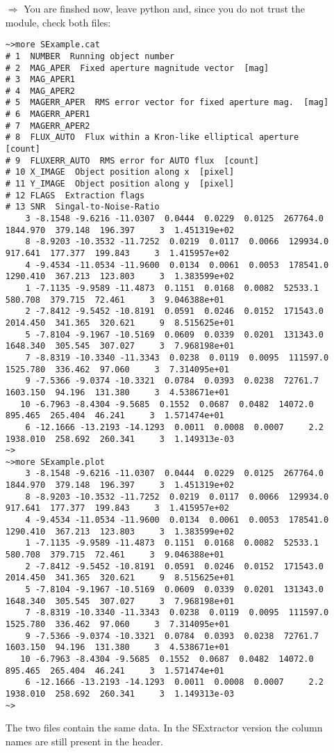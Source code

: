 \begin{itemize}
\item[$\Rightarrow$] You are finshed now, leave python and, since you do not
trust the \AAD module, check both files:
\begin{tiny}
\begin{verbatim}
~>more SExample.cat
# 1  NUMBER  Running object number
# 2  MAG_APER  Fixed aperture magnitude vector  [mag]
# 3  MAG_APER1
# 4  MAG_APER2
# 5  MAGERR_APER  RMS error vector for fixed aperture mag.  [mag]
# 6  MAGERR_APER1
# 7  MAGERR_APER2
# 8  FLUX_AUTO  Flux within a Kron-like elliptical aperture  [count]
# 9  FLUXERR_AUTO  RMS error for AUTO flux  [count]
# 10 X_IMAGE  Object position along x  [pixel]
# 11 Y_IMAGE  Object position along y  [pixel]
# 12 FLAGS  Extraction flags
# 13 SNR  Singal-to-Noise-Ratio
    3 -8.1548 -9.6216 -11.0307  0.0444  0.0229  0.0125  267764.0  1844.970  379.148  196.397     3  1.451319e+02
    8 -8.9203 -10.3532 -11.7252  0.0219  0.0117  0.0066  129934.0  917.641  177.377  199.843     3  1.415957e+02
    4 -9.4534 -11.0534 -11.9600  0.0134  0.0061  0.0053  178541.0  1290.410  367.213  123.803     3  1.383599e+02
    1 -7.1135 -9.9589 -11.4873  0.1151  0.0168  0.0082  52533.1  580.708  379.715  72.461     3  9.046388e+01
    2 -7.8412 -9.5452 -10.8191  0.0591  0.0246  0.0152  171543.0  2014.450  341.365  320.621     9  8.515625e+01
    5 -7.8104 -9.1967 -10.5169  0.0609  0.0339  0.0201  131343.0  1648.340  305.545  307.027     3  7.968198e+01
    7 -8.8319 -10.3340 -11.3343  0.0238  0.0119  0.0095  111597.0  1525.780  336.462  97.060     3  7.314095e+01
    9 -7.5366 -9.0374 -10.3321  0.0784  0.0393  0.0238  72761.7  1603.150  94.196  131.380     3  4.538671e+01
   10 -6.7963 -8.4304 -9.5685  0.1552  0.0687  0.0482  14072.0  895.465  265.404  46.241     3  1.571474e+01
    6 -12.1666 -13.2193 -14.1293  0.0011  0.0008  0.0007     2.2  1938.010  258.692  260.341     3  1.149313e-03
~>
~>more SExample.plot
    3 -8.1548 -9.6216 -11.0307  0.0444  0.0229  0.0125  267764.0  1844.970  379.148  196.397     3  1.451319e+02
    8 -8.9203 -10.3532 -11.7252  0.0219  0.0117  0.0066  129934.0  917.641  177.377  199.843     3  1.415957e+02
    4 -9.4534 -11.0534 -11.9600  0.0134  0.0061  0.0053  178541.0  1290.410  367.213  123.803     3  1.383599e+02
    1 -7.1135 -9.9589 -11.4873  0.1151  0.0168  0.0082  52533.1  580.708  379.715  72.461     3  9.046388e+01
    2 -7.8412 -9.5452 -10.8191  0.0591  0.0246  0.0152  171543.0  2014.450  341.365  320.621     9  8.515625e+01
    5 -7.8104 -9.1967 -10.5169  0.0609  0.0339  0.0201  131343.0  1648.340  305.545  307.027     3  7.968198e+01
    7 -8.8319 -10.3340 -11.3343  0.0238  0.0119  0.0095  111597.0  1525.780  336.462  97.060     3  7.314095e+01
    9 -7.5366 -9.0374 -10.3321  0.0784  0.0393  0.0238  72761.7  1603.150  94.196  131.380     3  4.538671e+01
   10 -6.7963 -8.4304 -9.5685  0.1552  0.0687  0.0482  14072.0  895.465  265.404  46.241     3  1.571474e+01
    6 -12.1666 -13.2193 -14.1293  0.0011  0.0008  0.0007     2.2  1938.010  258.692  260.341     3  1.149313e-03
~>
\end{verbatim}
\end{tiny}
The two files contain the same data. In the SExtractor version the column names
are still present in the header.
\end{itemize}
